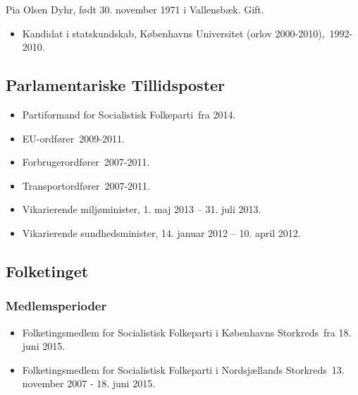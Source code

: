 \documentclass[11pt, a4paper]{awesome-cv}
\begin{document}
\makecvheader[R]
\makelettertitle
\begin{cvletter}
Pia Olsen Dyhr, født 30. november 1971 i Vallensbæk. Gift.

\begin{itemize}
\item Kandidat i statskundskab, Københavns Universitet (orlov 2000-2010), 1992-2010.
\end{itemize}
\subsection*{Parlamentariske Tillidsposter}
\begin{itemize}
\item Partiformand for Socialistisk Folkeparti fra 2014.
\item EU-ordfører 2009-2011.
\item Forbrugerordfører 2007-2011.
\item Transportordfører 2007-2011.
\item Vikarierende miljøminister, 1. maj 2013  –  31. juli 2013.
\item Vikarierende sundhedsminister, 14. januar 2012  – 10. april 2012.
\end{itemize}
\subsection*{Folketinget}
\subsubsection*{Medlemsperioder}
\begin{itemize}
\item Folketingsmedlem for Socialistisk Folkeparti i Københavns Storkreds fra 18. juni 2015.
\item Folketingsmedlem for Socialistisk Folkeparti i Nordsjællands Storkreds 13. november 2007 - 18. juni 2015.
\end{itemize}

\end{cvletter}
\end{document}
